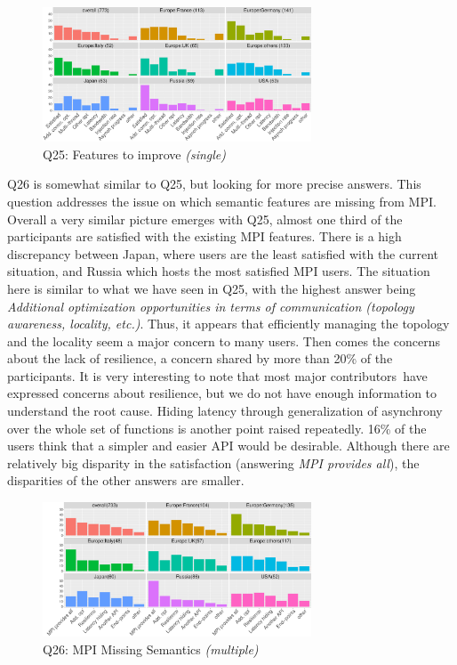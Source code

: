\documentclass[preprint,5p,times]{elsarticle}
\def\myquote#1{{\it #1}}
\newcommand{\revision}[2]{{\color{blue}#2}}
\def\mcountries{major contributors\xspace{}}%
\begin{document}
\begin{figure}[tb]
\begin{center}
\includegraphics[width=8.0cm]{R-scripts/Q25.pdf}
\vspace{-2mm}
\caption{Q25: Features to improve {\it(single)}}
\label{fig:missing-features}
\end{center}
\end{figure}

Q26 is somewhat similar to Q25, but looking for more precise answers. This
question \revision{tackles}{addresses} the issue on which semantic features are missing from MPI.
Overall a very similar picture emerges with Q25, almost one third of the
participants are satisfied with the existing MPI features. There is a high
discrepancy between Japan, where users are the least satisfied with the current
situation, and Russia which hosts the most satisfied MPI users.
%
The situation here is similar to what we \revision{}{have} seen in Q25, with the highest answer
being \myquote{Additional optimization opportunities in terms of communication
(topology awareness, locality, etc.)}. Thus, it appears that efficiently
managing the topology and the locality seem a major concern to many users. Then
comes the concerns about the lack of resilience, a concern shared by more than
20\% of the participants. It is very interesting to note that most \mcountries\
have expressed concerns about resilience, but we do not have enough information
to understand the root cause. Hiding latency through generalization of
asynchrony over the whole set of functions is another point raised repeatedly.
16\% of the users think that a simpler and easier API would be desirable.
Although there are relatively big disparity in the satisfaction (answering
\myquote{MPI provides all}), the disparities of the other answers are smaller.

\begin{figure}[tb]
\begin{center}
\includegraphics[width=8.0cm]{R-scripts/Q26.pdf}
\vspace{-2mm}
\caption{Q26: MPI Missing Semantics {\it(multiple)}}
\label{fig:missing-semantics}
\end{center}
\end{figure}
\end{document}

